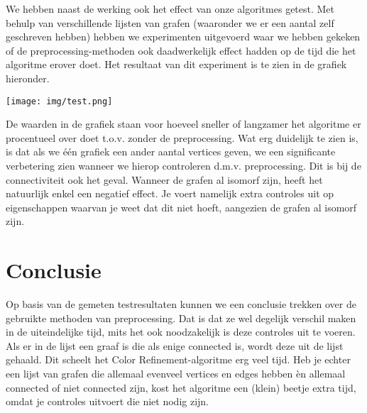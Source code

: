 \documentclass{article}
\begin{document}
We hebben naast de werking ook het effect van onze algoritmes getest. Met behulp van verschillende lijsten van grafen (waaronder we er een aantal zelf geschreven hebben) hebben we experimenten uitgevoerd waar we hebben gekeken of de preprocessing-methoden ook daadwerkelijk effect hadden op de tijd die het algoritme erover doet. Het resultaat van dit experiment is te zien in de grafiek hieronder.
\begin{center}
\texttt{[image: img/test.png]}
\end{center}
De waarden in de grafiek staan voor hoeveel sneller of langzamer het algoritme er procentueel over doet t.o.v. zonder de preprocessing. Wat erg duidelijk te zien is, is dat als we \'e\'en grafiek een ander aantal vertices geven, we een significante verbetering zien wanneer we hierop controleren d.m.v. preprocessing. Dit is bij de connectiviteit ook het geval. Wanneer de grafen al isomorf zijn, heeft het natuurlijk enkel een negatief effect. Je voert namelijk extra controles uit op eigenschappen waarvan je weet dat dit niet hoeft, aangezien de grafen al isomorf zijn.
\pagebreak


\section{Conclusie}
Op basis van de gemeten testresultaten kunnen we een conclusie trekken over de gebruikte methoden van preprocessing. Dat is dat ze wel degelijk verschil maken in de uiteindelijke tijd, mits het ook noodzakelijk is deze controles uit te voeren. Als er in de lijst een graaf is die als enige connected is, wordt deze uit de lijst gehaald. Dit scheelt het Color Refinement-algoritme erg veel tijd. Heb je echter een lijst van grafen die allemaal evenveel vertices en edges hebben \`en allemaal connected of niet connected zijn, kost het algoritme een (klein) beetje extra tijd, omdat je controles uitvoert die niet nodig zijn.
\pagebreak


\renewcommand{\refname}{Referenties}


\end{document}
